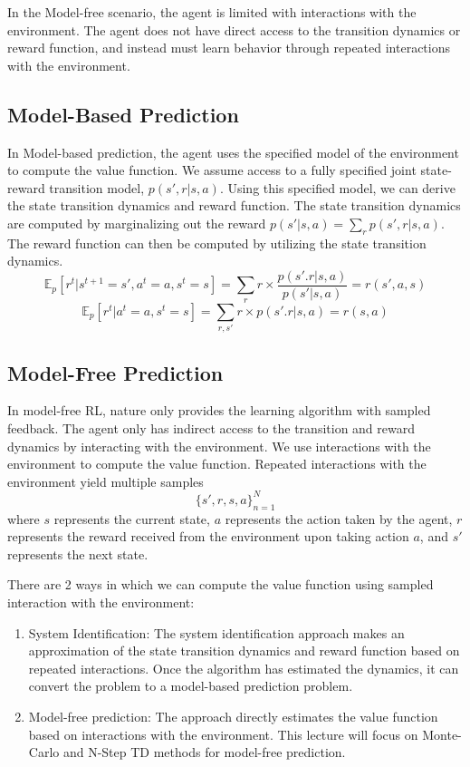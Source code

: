 \documentclass[11pt]{article}
\def\EE{\mathbb{E}}
\begin{document}
In the Model-free scenario, the agent is limited with interactions with the environment. The agent does not have direct access to the transition dynamics or reward function, and instead must learn behavior through repeated interactions with the environment. 



\subsection{Model-Based Prediction}

In Model-based prediction, the agent uses the specified model of the environment to compute the value function. We assume access to a fully specified joint state-reward transition model, $p(s', r|s,a)$. Using this specified model, we can derive the state transition dynamics and reward function. The state transition dynamics are computed by marginalizing out the reward $p(s'|s,a) = \sum_r p(s', r|s, a)$. The reward function can then be computed by utilizing the state transition dynamics.
$$\EE_p[r^t|s^{t+1}=s', a^t=a, s^t = s] = \sum_r r\times \frac{p(s'. r|s, a)}{p(s'|s,a)} = r(s', a, s)$$
$$\EE_p[r^t|a^t=a, s^t = s] = \sum_{r, s'} r\times p(s'. r|s, a) = r(s, a)$$


\subsection{Model-Free Prediction}
In model-free RL, nature only provides the learning algorithm with sampled feedback. The agent only has indirect access to the transition and reward dynamics by interacting with the environment. We use interactions with the environment to compute the value function. Repeated interactions with the environment yield multiple samples $$\{s', r, s, a\}_{n=1}^N$$ where $s$ represents the current state, $a$ represents the action taken by the agent, $r$ represents the reward received from the environment upon taking action $a$, and $s'$ represents the next state.

There are 2 ways in which we can compute the value function using sampled interaction with the environment:
\begin{enumerate}
    \item System Identification: The system identification approach makes an approximation of the state transition dynamics and reward function based on repeated interactions. Once the algorithm has estimated the dynamics, it can convert the problem to a model-based prediction problem. 
    \item Model-free prediction: The approach directly estimates the value function based on interactions with the environment. This lecture will focus on Monte-Carlo and N-Step TD methods for model-free prediction.
\end{enumerate}
\end{document}
